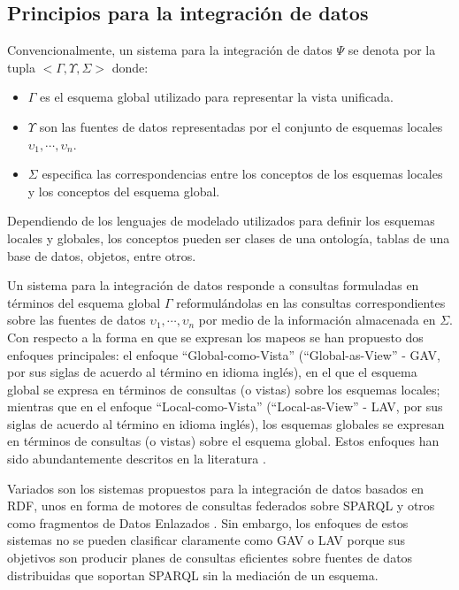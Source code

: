 \subsection{Principios para la integración de datos}
Convencionalmente, un sistema para la integración de datos $\Psi$ se denota por la tupla $<\Gamma , \Upsilon , \Sigma>$ donde:

\begin{itemize}
\item $\Gamma$ es el esquema global utilizado para representar la vista unificada.
\item $\Upsilon$ son las fuentes de datos representadas por el conjunto de esquemas locales $\upsilon_1 , \cdots , \upsilon_n$.
\item $\Sigma$ especifica las correspondencias entre los conceptos de los esquemas locales y los conceptos del esquema global.
\end{itemize}

Dependiendo de los lenguajes de modelado utilizados para definir los esquemas locales y globales, los conceptos pueden ser clases de una ontología, tablas de una base de datos, objetos, entre otros.

Un sistema para la integración de datos responde a consultas formuladas en términos del esquema global $\Gamma$ reformulándolas en las consultas correspondientes sobre las fuentes de datos $\upsilon_1 , \cdots , \upsilon_n$ por medio de la información almacenada en $\Sigma$. Con respecto a la forma en que se expresan los mapeos se han propuesto dos enfoques principales: el enfoque ``Global-como-Vista'' (``Global-as-View'' - GAV, por sus siglas de acuerdo al término en idioma inglés), en el que el esquema global se expresa en términos de consultas (o vistas) sobre los esquemas locales; mientras que en el enfoque ``Local-como-Vista'' (``Local-as-View'' - LAV, por sus siglas de acuerdo al término en idioma inglés), los esquemas globales se expresan en términos de consultas (o vistas) sobre el esquema global. Estos enfoques han sido abundantemente descritos en la literatura \citep{Doan:2012:PDI:2401764,Lenzerini:2002:DIT:543613.543644}.

Variados son los sistemas propuestos para la integración de datos basados en RDF, unos en forma de motores de consultas federados sobre SPARQL \citep{Schwarte:2011:FOT:2063016.2063055,Gorlitz:2011:SSE:2887352.2887354,Corby:2012:KVI:2457524.2457672,macina2016sparql} y otros como fragmentos de Datos Enlazados \citep{VERBORGH2016184}. Sin embargo, los enfoques de estos sistemas no se pueden clasificar claramente como GAV o LAV porque sus objetivos son producir planes de consultas eficientes sobre fuentes de datos distribuidas que soportan SPARQL sin la mediación de un esquema.

